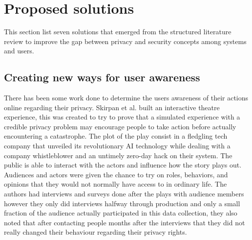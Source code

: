 %
%

\section{Proposed solutions}

\par This section list seven solutions that emerged from the structured
literature review to improve the gap between privacy and security concepts
among systems and users.

\subsection{Creating new ways for user awareness}

There has been some work done to determine the users awareness of their
actions online regarding their privacy. Skirpan et al. \cite{SkirpanPrivacy}
built an interactive theatre experience, this was created to try to prove
that a simulated experience with a credible privacy problem may encourage
people to take action before actually encountering a catastrophe. The plot
of the play consist in a fledgling tech company that unveiled its revolutionary
AI technology while dealing with a company whistleblower and an untimely
zero-day hack on their system. The public is able to interact with the actors
and influence how the story plays out. Audiences and actors were given the
chance to try on roles, behaviors, and opinions that they would not normally
have access to in ordinary life. The authors had interviews and surveys
done after the plays with audience members however they only did interviews
halfway through production and only a small fraction of the audience actually
participated in this data collection, they also noted that after contacting
people months after the interviews that they did not really changed their
behaviour regarding their privacy rights.


